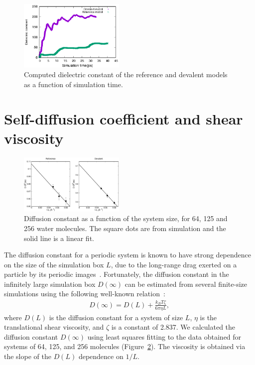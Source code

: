 \documentclass[10pt,amsmath,twocolumn,aps,prl,superscriptaddress,floatfix]{revtex4-1}
\newcommand{\bea}{\begin{eqnarray}}
\newcommand{\eea}{\end{eqnarray}}
\begin{document}
\begin{figure}[t]
\includegraphics[width=0.45\textwidth]{dielectric}
\caption{Computed dielectric constant of the reference and devalent models as a function of simulation time.}\label{Fig:dielectric}
\end{figure} 


\section{Self-diffusion coefficient and shear viscosity} 

\begin{figure}[t]
\includegraphics[width=0.45\textwidth]{msd}
\caption{Diffusion constant as a function of the system size, for 64, 125 and 256 water molecules. 
The square dots are from simulation and the solid line is a linear fit.}\label{Fig:dfs}
\end{figure} 

The diffusion constant for a periodic system is known to have strong dependence on the size of the simulation box $L$, due to the long-range drag exerted on a particle by its periodic images~\cite{dunweg1993molecular}. 
Fortunately, the diffusion constant in the infinitely large simulation box $D(\infty)$ can be estimated from several finite-size simulations using the following well-known relation~\cite{dunweg1993molecular}:
%
\bea
D(\infty) = D(L) + \frac{k_BT\zeta}{6\pi \eta L},
\eea
%
where $D(L)$ is the diffusion constant for a system of size $L$, $\eta$ is the translational shear viscosity, and $\zeta$ is a constant of 2.837. 
We calculated the diffusion constant $D(\infty)$ using least squares fitting to the data obtained for systems of 64, 125, and 256 molecules (Figure~\ref{Fig:dfs}). The viscosity is obtained via the slope of the $D(L)$ dependence on $1/L$.
\end{document}
